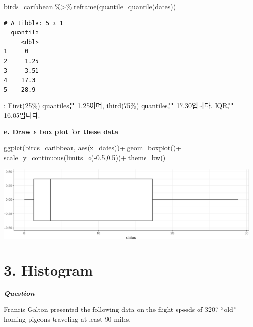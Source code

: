 \documentclass[
  letterpaper,
  DIV=11,
  numbers=noendperiod]{scrreprt}
\newenvironment{Shaded}{\begin{snugshade}}{\end{snugshade}}
\newcommand{\AttributeTok}[1]{\textcolor[rgb]{0.40,0.45,0.13}{#1}}
\newcommand{\FloatTok}[1]{\textcolor[rgb]{0.68,0.00,0.00}{#1}}
\newcommand{\FunctionTok}[1]{\textcolor[rgb]{0.28,0.35,0.67}{#1}}
\newcommand{\NormalTok}[1]{\textcolor[rgb]{0.00,0.23,0.31}{#1}}
\newcommand{\SpecialCharTok}[1]{\textcolor[rgb]{0.37,0.37,0.37}{#1}}
\begin{document}
\begin{Shaded}
\begin{Highlighting}[]
\NormalTok{birds\_caribbean }\SpecialCharTok{\%\textgreater{}\%} 
  \FunctionTok{reframe}\NormalTok{(}\AttributeTok{quantile=}\FunctionTok{quantile}\NormalTok{(dates))}
\end{Highlighting}
\end{Shaded}

\begin{verbatim}
# A tibble: 5 x 1
  quantile
     <dbl>
1     0   
2     1.25
3     3.51
4    17.3 
5    28.9 
\end{verbatim}

: First(25\%) quantiles은 1.25이며, third(75\%) quantiles은 17.30입니다.
IQR은 16.05입니다.

\textbf{e. Draw a box plot for these data}

\begin{Shaded}
\begin{Highlighting}[]
\FunctionTok{ggplot}\NormalTok{(birds\_caribbean, }\FunctionTok{aes}\NormalTok{(}\AttributeTok{x=}\NormalTok{dates))}\SpecialCharTok{+}
  \FunctionTok{geom\_boxplot}\NormalTok{()}\SpecialCharTok{+}
  \FunctionTok{scale\_y\_continuous}\NormalTok{(}\AttributeTok{limits=}\FunctionTok{c}\NormalTok{(}\SpecialCharTok{{-}}\FloatTok{0.5}\NormalTok{,}\FloatTok{0.5}\NormalTok{))}\SpecialCharTok{+}
  \FunctionTok{theme\_bw}\NormalTok{()}
\end{Highlighting}
\end{Shaded}

\includegraphics{경영통계분석_hw1_files/figure-pdf/unnamed-chunk-6-1.pdf}

\section*{3. Histogram}\label{histogram}


\textbf{\emph{Question}}

Francis Galton presented the following data on the flight speeds of 3207
``old'' homing pigeons traveling at least 90 miles.
\end{document}
